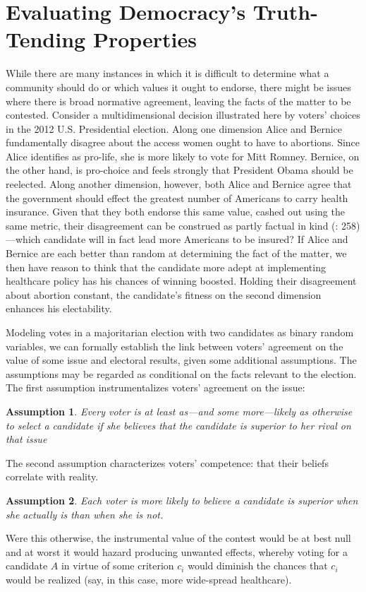 \documentclass[11pt]{article}
\newtheorem{ass}{Assumption}
\begin{document}
\section{Evaluating Democracy's Truth-Tending Properties}\label{sec:theory}


While there are many instances in which it is difficult to determine what a community should do or which values it ought to endorse, there might be issues where there is broad normative agreement, leaving the facts of the matter to be contested.
 Consider a multidimensional decision illustrated here by voters' choices in the 2012 U.S. Presidential election. Along one dimension Alice and Bernice fundamentally disagree about the access women ought to have to abortions. Since Alice identifies as pro-life, she is more likely to vote for Mitt Romney. Bernice, on the other hand, is pro-choice and feels strongly that President Obama should be reelected. Along another dimension, however, both Alice and Bernice agree that the government should effect the greatest number of Americans to carry health insurance. Given that they both endorse this same value, cashed out using the same metric, their disagreement can be construed as partly factual in kind (\citet{Page2007}: 258)---which candidate will in fact lead more Americans to be insured? If Alice and Bernice are each better than random at determining the fact of the matter, we then have reason to think that the candidate more adept at implementing healthcare policy has his chances of winning boosted. Holding their disagreement about abortion constant, the candidate's fitness on the second dimension enhances his electability.

Modeling votes in a majoritarian election with two candidates as
binary random variables, we can formally establish the link between voters' agreement on the value of some issue and electoral results, given some additional assumptions.
The assumptions may be regarded as conditional on the facts relevant to the election. 
The first assumption instrumentalizes voters' agreement on the issue:
\begin{ass}\label{ass:preference}
Every voter is at least as---and some more---likely as otherwise to select a candidate if she believes  that the candidate is superior to her rival on that issue
\end{ass}
The second assumption characterizes voters' competence: that their beliefs correlate with reality. 
\begin{ass}\label{ass:belief}%
Each voter is more likely to believe a candidate is
          superior when she actually is than when she is not. 
\end{ass}
Were this otherwise, the instrumental value of the contest would be at best null and at worst it would hazard producing unwanted effects, whereby voting for a candidate $A$ in virtue of some criterion $c_i$ would diminish the chances that $c_i$ would be realized (say, in this case, more wide-spread healthcare).
\end{document}
